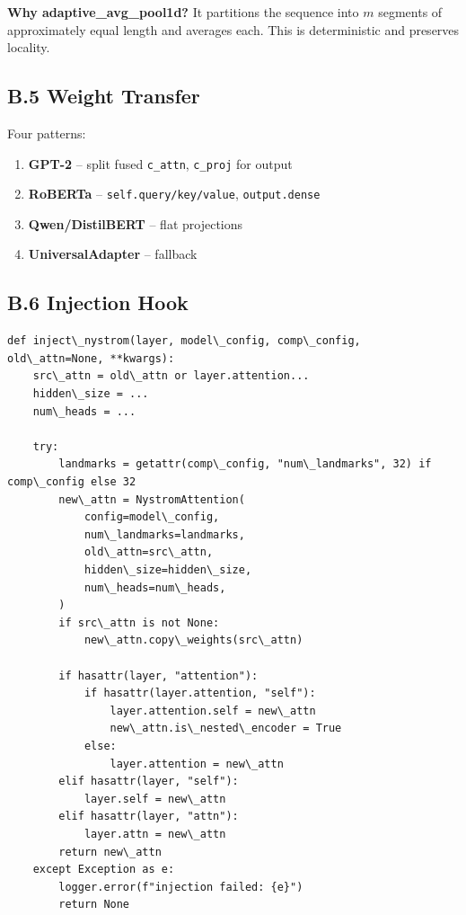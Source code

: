 \textbf{Why adaptive\_avg\_pool1d?} It partitions the sequence into $m$ segments 
of approximately equal length and averages each. This is deterministic and 
preserves locality.

\subsection{B.5 Weight Transfer}

Four patterns:

\begin{enumerate}
\item \textbf{GPT-2} -- split fused \texttt{c\_attn}, \texttt{c\_proj} for output
\item \textbf{RoBERTa} -- \texttt{self.query/key/value}, \texttt{output.dense}
\item \textbf{Qwen/DistilBERT} -- flat projections
\item \textbf{UniversalAdapter} -- fallback

\end{enumerate}
\subsection{B.6 Injection Hook}

\begin{lstlisting}
def inject\_nystrom(layer, model\_config, comp\_config, old\_attn=None, **kwargs):
    src\_attn = old\_attn or layer.attention...
    hidden\_size = ...
    num\_heads = ...
    
    try:
        landmarks = getattr(comp\_config, "num\_landmarks", 32) if comp\_config else 32
        new\_attn = NystromAttention(
            config=model\_config,
            num\_landmarks=landmarks,
            old\_attn=src\_attn,
            hidden\_size=hidden\_size,
            num\_heads=num\_heads,
        )
        if src\_attn is not None:
            new\_attn.copy\_weights(src\_attn)
        
        if hasattr(layer, "attention"):
            if hasattr(layer.attention, "self"):
                layer.attention.self = new\_attn
                new\_attn.is\_nested\_encoder = True
            else:
                layer.attention = new\_attn
        elif hasattr(layer, "self"):
            layer.self = new\_attn
        elif hasattr(layer, "attn"):
            layer.attn = new\_attn
        return new\_attn
    except Exception as e:
        logger.error(f"injection failed: {e}")
        return None
\end{lstlisting}


